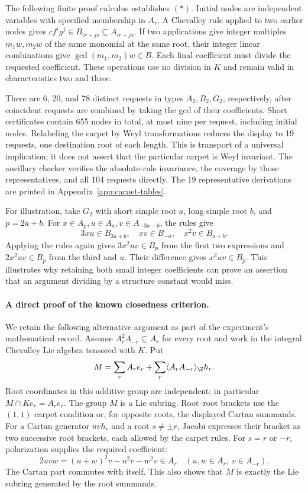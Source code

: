 The following finite proof calculus establishes \((\ast)\).
Initial nodes are independent variables with specified membership
in \(A_r\). A Chevalley rule applied to two earlier nodes gives
\(c f^i g^j\in B_{ir+js}\subseteq A_{ir+js}\).
If two applications give integer multiples \(m_1w,m_2w\) of the
same monomial at the same root, their integer linear combinations
give \(\gcd(m_1,m_2)w\in B\). Each final coefficient must divide
the requested coefficient. These operations use no division in \(K\)
and remain valid in characteristics two and three.

There are 6, 20, and 78 distinct requests in types \(A_2,B_2,G_2\),
respectively, after coincident requests are combined by taking the
gcd of their coefficients. Short certificates contain 655 nodes in
total, at most nine per request, including initial nodes. Relabeling
the carpet by Weyl transformations reduces the display to 19 requests,
one destination root of each length. This is transport of a universal
implication; it does not assert that the particular carpet is Weyl
invariant. The ancillary checker verifies the absolute-rule invariance,
the coverage by those representatives, and all 104 requests directly.
The 19 representative derivations are printed in
Appendix~\ref{app:carpet-tables}.

For illustration, take \(G_2\) with short simple root \(a\), long
simple root \(b\), and \(p=2a+b\). For
\(x\in A_p,u\in A_a,v\in A_{-3a-b}\), the rules give
\[
 3xu\in B_{3a+b},\quad xv\in B_{-a},\quad
 x^2v\in B_{a+b}.
\]
Applying the rules again gives \(3x^2uv\in B_p\) from the first
two expressions and \(2x^2uv\in B_p\) from the third and \(u\).
Their difference gives \(x^2uv\in B_p\). This illustrates why
retaining both small integer coefficients can prove an assertion
that an argument dividing by a structure constant would miss.

\paragraph{A direct proof of the known closedness criterion.}
We retain the following alternative argument as part of the
experiment's mathematical record. Assume \(A_r^2A_{-r}\subseteq A_r\)
for every root and work in the integral Chevalley Lie algebra tensored
with \(K\). Put
\[
 M=\sum_r A_re_r+
       \sum_r\langle A_rA_{-r}\rangle_{\Z}h_r.
\]
Root coordinates in this additive group are independent; in particular
\(M\cap Ke_r=A_re_r\). The group \(M\) is a Lie subring.
Root--root brackets use the \((1,1)\) carpet condition or, for
opposite roots, the displayed Cartan summands. For a Cartan generator
\(uvh_r\) and a root \(s\ne\pm r\), Jacobi expresses their bracket
as two successive root brackets, each allowed by the carpet rules.
For \(s=r\) or \(-r\), polarization supplies the required coefficient:
\[
 2uvw=(u+w)^2v-u^2v-w^2v\in A_r
 \quad (u,w\in A_r,\ v\in A_{-r}).
\]
The Cartan part commutes with itself. This also shows that \(M\)
is exactly the Lie subring generated by the root summands.


